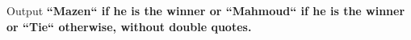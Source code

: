Output \bf{``Mazen``} if he is the winner or \bf{``Mahmoud``} if he is the winner or \bf{``Tie``} otherwise, without double quotes.